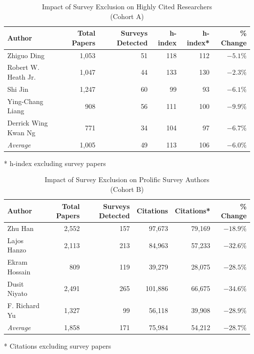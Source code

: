 \begin{table}[t]
\centering
\caption{Impact of Survey Exclusion on Highly Cited Researchers\\ (Cohort A)}
\label{tab:cohort_a}
\begin{tabular}{lrrrrr}
\hline
\textbf{Author} & \textbf{Total Papers} & \textbf{Surveys Detected} & \textbf{h-index} & \textbf{h-index*} & \textbf{\% Change} \\
\hline
Zhiguo Ding & 1{,}053 & 51 & 118 & 112 & $-5.1\%$ \\
Robert W. Heath Jr. & 1{,}047 & 44 & 133 & 130 & $-2.3\%$ \\
Shi Jin & 1{,}247 & 60 & 99 & 93 & $-6.1\%$ \\
Ying-Chang Liang & 908 & 56 & 111 & 100 & $-9.9\%$ \\
Derrick Wing Kwan Ng & 771 & 34 & 104 & 97 & $-6.7\%$ \\
\hline
\textit{Average} & 1{,}005 & 49 & 113 & 106 & $-6.0\%$ \\
\hline
\end{tabular}

\vspace{2pt}\footnotesize{* h-index excluding survey papers}
\end{table}

\begin{table}[t]
\centering
\caption{Impact of Survey Exclusion on Prolific Survey Authors\\ (Cohort B)}
\label{tab:cohort_b}
\begin{tabular}{lrrrrr}
\hline
\textbf{Author} & \textbf{Total Papers} & \textbf{Surveys Detected} & \textbf{Citations} & \textbf{Citations*} & \textbf{\% Change} \\
\hline
Zhu Han & 2{,}552 & 157 & 97{,}673 & 79{,}169 & $-18.9\%$ \\
Lajos Hanzo & 2{,}113 & 213 & 84{,}963 & 57{,}233 & $-32.6\%$ \\
Ekram Hossain & 809 & 119 & 39{,}279 & 28{,}075 & $-28.5\%$ \\
Dusit Niyato & 2{,}491 & 265 & 101{,}886 & 66{,}675 & $-34.6\%$ \\
F. Richard Yu & 1{,}327 & 99 & 56{,}118 & 39{,}908 & $-28.9\%$ \\
\hline
\textit{Average} & 1{,}858 & 171 & 75{,}984 & 54{,}212 & $-28.7\%$ \\
\hline
\end{tabular}

\vspace{2pt}\footnotesize{* Citations excluding survey papers}
\end{table}
